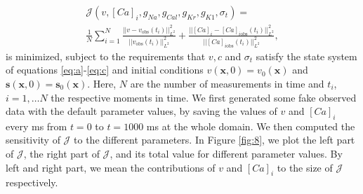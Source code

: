 \documentclass[12pt,a4paper]{article}
\begin{document}
\begin{eqnarray} \nonumber
\mathcal{J}(v, [Ca]_i, g_{Na}, g_{Cal}, g_{Kr}, g_{K1}, \sigma_t)= \\
\frac{1}{N} \sum_{i=1}^{N} \frac{||v-v_{\text{obs}}(t_i)||^2_{L^2}}{||v_{\text{obs}}(t_i)||^2_{L^2}} + \frac{||[Ca]_i-[Ca]_{i\text{obs}}(t_i) ||^2_{L^2}}{||[Ca]_{i\text{obs}}(t_i) ||^2_{L^2}},\label{J}
\end{eqnarray}
is minimized, subject to the requirements that $v, c$ and $\sigma_t$ satisfy the state system of equations \eqref{eq:a}-\eqref{eq:c} and initial conditions $v(\textbf{x},0)=v_0(\textbf{x})$ and $\mathbf{s}(\mathbf{x},0)=\mathbf{s}_0(\mathbf{x})$. Here, $N$ are the number of measurements in time and $t_i$, $i=1, \dots N$ the respective moments in time. We first generated some fake observed data with the default parameter values, by saving the values of $v$ and $[Ca]_i$ every ms from $t=0$ to $t=1000$ ms at the whole domain. We then computed the sensitivity of $\mathcal{J}$ to the different parameters. In Figure \ref{fig:8}, we plot the left part of $\mathcal{J}$, the right part of $\mathcal{J}$, and its total value for different parameter values. By left and right part, we mean the contributions of $v$ and $[Ca]_i$ to the size of $\mathcal{J}$ respectively. 
\end{document}
